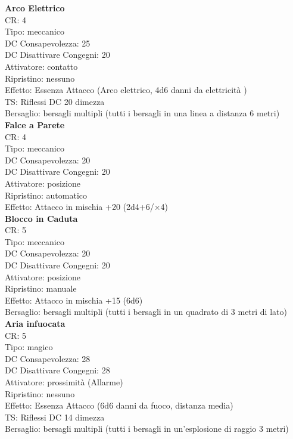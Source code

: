 \documentclass[a4paper,11pt,twoside,openany]{book}
\begin{document}
{\begin{multicols}{2}
\textbf{Arco Elettrico}\\
CR: 4 \\
Tipo: meccanico \\
DC Consapevolezza: 25 \\
DC Disattivare Congegni: 20 \\
Attivatore: contatto \\
Ripristino: nessuno \\
Effetto: Essenza Attacco (Arco elettrico, 4d6 danni da elettricità )\\
TS: Riflessi DC 20 dimezza \\
Bersaglio: bersagli multipli (tutti i bersagli in una linea a distanza 6 metri)\\

\textbf{Falce a Parete}\\
CR: 4 \\
Tipo: meccanico \\
DC Consapevolezza: 20 \\
DC Disattivare Congegni: 20 \\
Attivatore: posizione \\
Ripristino: automatico \\
Effetto: Attacco in mischia +20 (2d4+6/×4)\\

\textbf{Blocco in Caduta}\\
CR: 5 \\
Tipo: meccanico \\
DC Consapevolezza: 20 \\
DC Disattivare Congegni: 20 \\
Attivatore: posizione \\
Ripristino: manuale \\
Effetto: Attacco in mischia +15 (6d6) \\
Bersaglio: bersagli multipli (tutti i bersagli in un quadrato di 3 metri di lato)\\

\textbf{Aria infuocata}\\
CR: 5 \\
Tipo: magico \\
DC Consapevolezza: 28 \\
DC Disattivare Congegni: 28 \\
Attivatore: prossimità (Allarme) \\
Ripristino: nessuno \\
Effetto: Essenza Attacco (6d6 danni da fuoco, distanza media)\\
TS: Riflessi DC 14 dimezza \\
Bersaglio: bersagli multipli (tutti i bersagli in un’esplosione di raggio 3 metri)\\


\end{multicols}}
\end{document}
